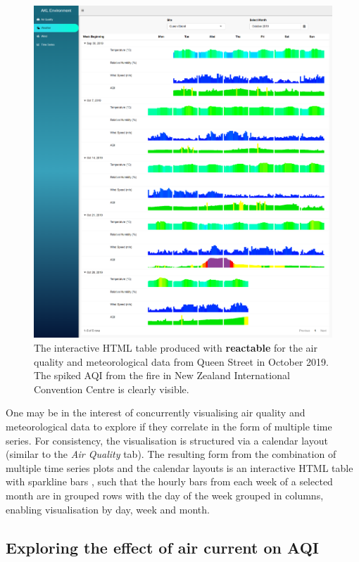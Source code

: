 \documentclass{aucklandthesis}
\begin{document}
\begin{figure}
\includegraphics[width=1\linewidth]{figures/met-tab} \caption{The interactive HTML table produced with \textbf{reactable} \autocite{reactable} for the air quality and meteorological data from Queen Street in October 2019. The spiked AQI from the fire in New Zealand International Convention Centre is clearly visible.}\label{fig:unnamed-chunk-3}
\end{figure}



One may be in the interest of concurrently visualising air quality and meteorological data to explore if they correlate in the form of multiple time series. For consistency, the visualisation is structured via a calendar layout (similar to the \emph{Air Quality} tab). The resulting form from the combination of multiple time series plots and the calendar layouts is an interactive HTML table with sparkline bars \autocite{sparkline}, such that the hourly bars from each week of a selected month are in grouped rows with the day of the week grouped in columns, enabling visualisation by day, week and month.

\hypertarget{sec:wind-plot}{%
\subsection{Exploring the effect of air current on AQI}\label{sec:wind-plot}}
\end{document}
